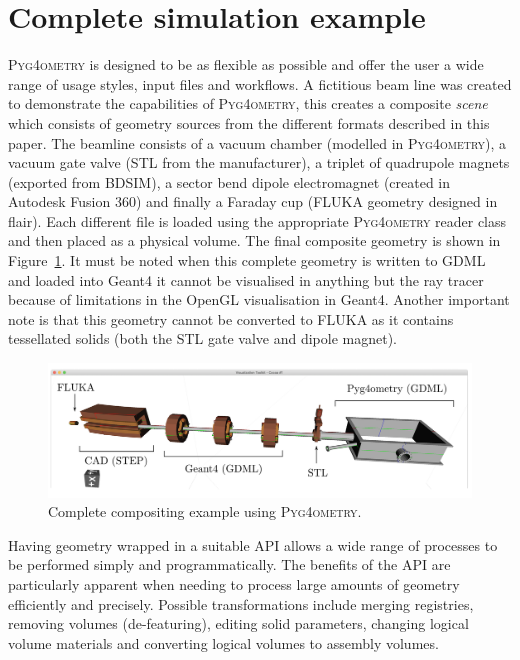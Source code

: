 \documentclass[final,5p,times,twocolumn]{elsarticle}
\newcommand{\PYGEOMETRY}{\textsc{Pyg4ometry}}
\begin{document}
\section{Complete simulation example}
\PYGEOMETRY{} is designed to be as flexible as possible and offer the user a wide range of usage styles, input files 
and workflows. A fictitious beam line was created to demonstrate the capabilities of \PYGEOMETRY, this creates a composite 
\emph{scene} which consists of geometry sources from the different formats described in this paper. The beamline consists of a vacuum chamber 
(modelled in \PYGEOMETRY{}), a vacuum gate valve (STL from the manufacturer), a triplet of quadrupole magnets (exported 
from BDSIM), a sector bend dipole electromagnet (created in Autodesk Fusion 360) and finally a Faraday cup (FLUKA geometry designed in 
flair). Each different file is loaded using the appropriate \PYGEOMETRY{} reader class and then placed as a physical volume. The final composite 
geometry is shown in Figure~\ref{fig:model}. It must be noted when this complete geometry is written to GDML and loaded into 
Geant4 it cannot be visualised in anything but the ray tracer because of limitations in the OpenGL visualisation in Geant4. Another 
important note is that this geometry cannot be converted to FLUKA as it contains tessellated solids (both the STL gate valve and
dipole magnet). 
%
\begin{figure}
\begin{center}
\includegraphics[width=1.0\textwidth]{./model-scene/model.pdf}
\caption{Complete compositing example using \PYGEOMETRY{}.}
\label{fig:model}
\end{center}
\end{figure}

Having geometry wrapped in a suitable API allows a wide range of processes to be performed simply and programmatically. The benefits of the API are
particularly apparent when needing to process large amounts of geometry efficiently and precisely. Possible transformations include merging registries, 
removing volumes (de-featuring), editing solid parameters, changing logical volume materials and converting logical volumes to assembly volumes.
\end{document}
